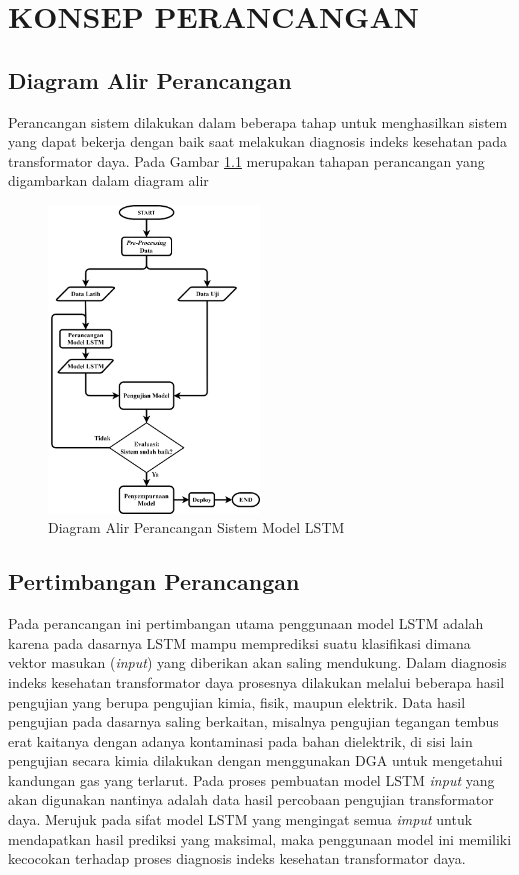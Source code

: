 \chapter{KONSEP PERANCANGAN}
\label{BAB3:Metode}
\section{Diagram Alir Perancangan}
Perancangan sistem dilakukan dalam beberapa tahap untuk menghasilkan sistem 
yang dapat bekerja dengan baik saat melakukan diagnosis indeks kesehatan pada 
transformator daya. Pada Gambar \ref{gambar:diagram alir} merupakan tahapan perancangan yang 
digambarkan dalam diagram alir
\begin{figure}[h]
	\begin{center}
		\includegraphics[width=0.5\textwidth]{BAB-3/figures/diagram alir.png}	
		\caption{Diagram Alir Perancangan Sistem Model LSTM}
		\label{gambar:diagram alir}
	\end{center}
\end{figure}

\section{Pertimbangan Perancangan}
Pada perancangan ini pertimbangan utama penggunaan model LSTM adalah karena pada dasarnya LSTM mampu memprediksi suatu klasifikasi dimana vektor masukan (\textit{input}) yang diberikan akan saling mendukung. Dalam diagnosis indeks kesehatan transformator daya prosesnya dilakukan melalui beberapa hasil pengujian yang berupa pengujian kimia, fisik, maupun elektrik. Data hasil pengujian pada dasarnya saling berkaitan, misalnya pengujian tegangan tembus erat kaitanya dengan adanya kontaminasi pada bahan dielektrik, di sisi lain pengujian secara kimia dilakukan dengan menggunakan DGA untuk mengetahui kandungan gas yang terlarut. Pada proses pembuatan model LSTM \textit{input} yang akan digunakan nantinya adalah data hasil percobaan pengujian transformator daya. Merujuk pada sifat model LSTM yang mengingat semua \textit{imput} untuk mendapatkan hasil prediksi yang maksimal, maka penggunaan model ini memiliki kecocokan terhadap proses diagnosis indeks kesehatan transformator daya. \par 


